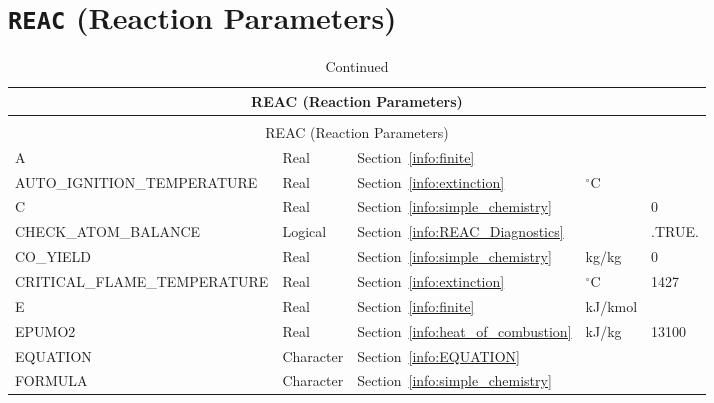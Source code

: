\documentclass[11pt]{book}
\begin{document}
\section{\texorpdfstring{{\tt REAC}}{REAC} (Reaction Parameters)}
\begin{longtable}{@{\extracolsep{\fill}}|l|l|l|l|l|}
\caption[Reaction parameters ({\ct REAC} namelist group)]{For more information see Chapter~\ref{chap:combustion}.}
\label{tbl:REAC} \\
\hline
\multicolumn{5}{|c|}{{\ct REAC} (Reaction Parameters)} \\
\hline \hline
\endfirsthead
\caption[]{Continued} \\
\hline
\multicolumn{5}{|c|}{{\ct REAC} (Reaction Parameters)} \\
\hline \hline
\endhead
{\ct A}                                   & Real        & Section~\ref{info:finite}                 &                   &                   \\ \hline
{\ct AUTO\_IGNITION\_TEMPERATURE}         & Real        & Section~\ref{info:extinction}             & $^\circ$C         &                   \\ \hline
{\ct C}                                   & Real        & Section~\ref{info:simple_chemistry}       &                   & 0                 \\ \hline
{\ct CHECK\_ATOM\_BALANCE}                & Logical     & Section~\ref{info:REAC_Diagnostics}       &                   & {\ct .TRUE.}      \\ \hline
{\ct CO\_YIELD}                           & Real        & Section~\ref{info:simple_chemistry}       & kg/kg             & 0                 \\ \hline
{\ct CRITICAL\_FLAME\_TEMPERATURE}        & Real        & Section~\ref{info:extinction}             &   $^\circ$C       & 1427              \\ \hline
{\ct E}                                   & Real        & Section~\ref{info:finite}                 &   kJ/kmol         &                   \\ \hline
{\ct EPUMO2}                              & Real        & Section~\ref{info:heat_of_combustion}     &   kJ/kg           & 13100             \\ \hline
{\ct EQUATION}                            & Character   & Section~\ref{info:EQUATION}               &                   &                   \\ \hline
{\ct FORMULA}                             & Character   & Section~\ref{info:simple_chemistry}       &                   &                   \\ \hline

\end{longtable}
\end{document}
